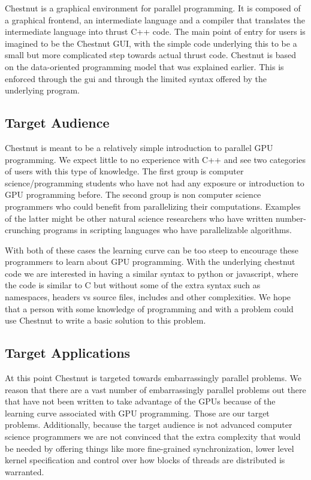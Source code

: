 \documentclass[twocolumn]{article}
\renewcommand{\|}{\origbar} %
\begin{document}
Chestnut is a graphical environment for parallel programming. It is composed of a graphical frontend, an intermediate language and a compiler that translates the intermediate language into thrust C++ code. The main point of entry for users is imagined to be the Chestnut GUI, with the simple code underlying this to be a small but more complicated step towards actual thrust code. Chestnut is based on the data-oriented programming model that was explained earlier. This is enforced through the gui and through the limited syntax offered by the underlying program.

\subsection{Target Audience}

Chestnut is meant to be a relatively simple introduction to parallel GPU programming. We expect little to no experience with C++ and see two categories of users with this type of knowledge. The first group is computer science/programming students who have not had any exposure or introduction to GPU programming before. The second group is non computer science programmers who could benefit from parallelizing their computations. Examples of the latter might be other natural science researchers who have written number-crunching programs in scripting languages who have parallelizable algorithms.

With both of these cases the learning curve can be too steep to encourage these programmers to learn about GPU programming. With the underlying chestnut code we are interested in having a similar syntax to python or javascript, where the code is similar to C but without some of the extra syntax such as namespaces, headers vs source files, includes and other complexities. We hope that a person with some knowledge of programming and with a problem could use Chestnut to write a basic solution to this problem.

\subsection{Target Applications}

At this point Chestnut is targeted towards embarrassingly parallel problems. We reason that there are a vast number of embarrassingly parallel problems out there that have not been written to take advantage of the GPUs because of the learning curve associated with GPU programming. Those are our target problems. Additionally, because the target audience is not advanced computer science programmers we are not convinced that the extra complexity that would be needed by offering things like more fine-grained synchronization, lower level kernel specification and control over how blocks of threads are distributed is warranted.
\end{document}
